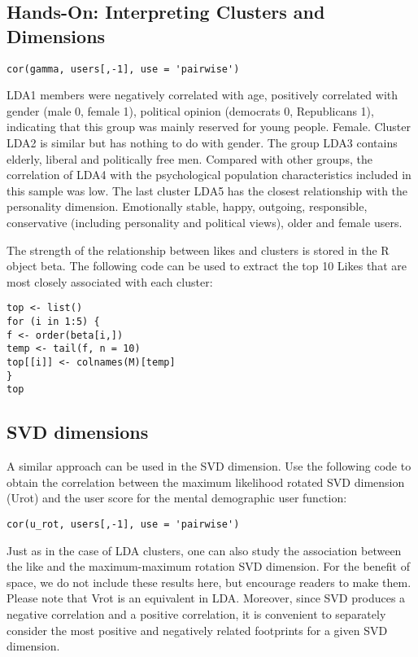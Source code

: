 \subsection{Hands-On: Interpreting Clusters and Dimensions}

\begin{verbatim}
cor(gamma, users[,-1], use = 'pairwise')
\end{verbatim}

LDA1 members were negatively correlated with age, positively 
correlated with gender (male 0, female 1), political opinion 
(democrats 0, Republicans 1), indicating that this group was mainly
 reserved for young people. Female. Cluster LDA2 is similar but has
 nothing to do with gender. The group LDA3 contains elderly, 
liberal and politically free men. Compared with other groups, the 
correlation of LDA4 with the psychological population 
characteristics included in this sample was low. The last cluster 
LDA5 has the closest relationship with the personality dimension. 
Emotionally stable, happy, outgoing, responsible, conservative 
(including personality and political views), older and female users.

The strength of the relationship between likes and clusters is 
stored in the R object beta. The following code can be used to 
extract the top 10 Likes that are most closely associated with each
 cluster:

\begin{verbatim}
top <- list()
for (i in 1:5) {
f <- order(beta[i,])
temp <- tail(f, n = 10)
top[[i]] <- colnames(M)[temp]
}
top
\end{verbatim}

\subsection{SVD dimensions}

A similar approach can be used in the SVD dimension. Use the 
following code to obtain the correlation between the maximum 
likelihood rotated SVD dimension (Urot) and the user score for the
 mental demographic user function:

\begin{verbatim}
cor(u_rot, users[,-1], use = 'pairwise')
\end{verbatim}

Just as in the case of LDA clusters, one can also study the 
association between the like and the maximum-maximum rotation SVD 
dimension. For the benefit of space, we do not include these 
results here, but encourage readers to make them. Please note that
 Vrot is an equivalent in LDA. Moreover, since SVD produces a 
negative correlation and a positive correlation, it is convenient 
to separately consider the most positive and negatively related 
footprints for a given SVD dimension.


